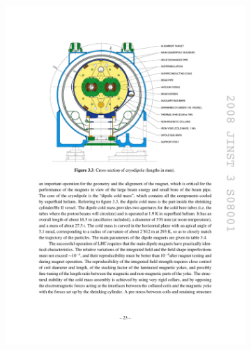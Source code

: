 \begin{figure}[htbp]
	\centering
	\begin{subfigure}{.5\textwidth}
  		\centering
  		\includegraphics[width=\linewidth]{Figures/LHC_magnet.pdf}
  		\caption{}
  		\label{fig:LHC_magDraw}
	\end{subfigure}
	\begin{subfigure}{.5\textwidth}
  		\centering

\end{subfigure}
\end{figure}
